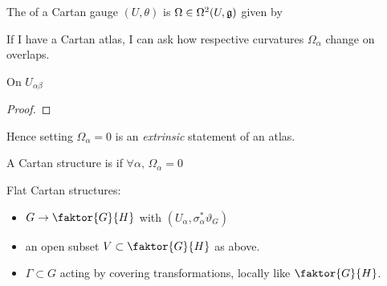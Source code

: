 \documentclass{article}
\begin{document}
\begin{definition}
The  of a Cartan gauge $(U,\theta)$ is $\Omega \in \Omega^2(U,\mathfrak{g})$ given by 
\end{definition}
If I have a Cartan atlas, I can ask how respective curvatures $\Omega_\alpha$ change on overlaps. 
\begin{lemma}
On $U_{\alpha\beta}$
\end{lemma}
\begin{proof}
\end{proof}
Hence setting $\Omega_\alpha=0$ is an \emph{extrinsic} statement of an atlas. 

\begin{definition}
A Cartan structure is  if $\forall \alpha , \, \Omega_\alpha = 0$
\end{definition}

\begin{example}
Flat Cartan structures: 
\begin{itemize}
    \item $G \to \faktor{G}{H}$ with $(U_\alpha,\sigma_\alpha^\ast \vartheta_G)$
    \item an open subset $V\subset \faktor{G}{H}$ as above.
    \item $\Gamma \subset G$ acting by covering transformations, locally like $\faktor{G}{H}$. 
\end{itemize}
\end{example}
\end{document}
